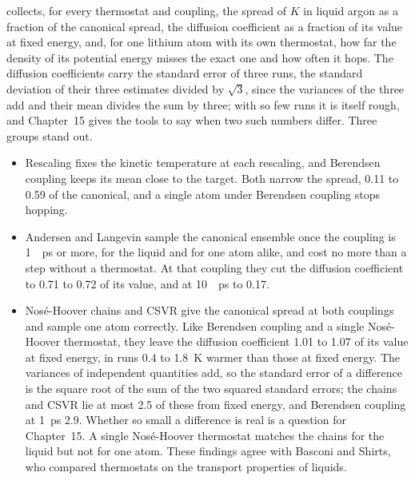  collects, for every thermostat and coupling, the
spread of $K$ in liquid argon as a fraction of the canonical spread, the
diffusion coefficient as a fraction of its value at fixed energy, and,
for one lithium atom with its own thermostat, how far the density of its
potential energy misses the exact one and how often it hops. The
diffusion coefficients carry the standard error of three runs, the
standard deviation of their three estimates divided by $\sqrt3$, since the variances of
the three add and their mean divides the sum by three; with so few runs it
is itself rough, and Chapter~15 gives the tools to say when two such
numbers differ. Three groups stand out.
\begin{itemize}
\item Rescaling fixes the kinetic temperature at each rescaling, and Berendsen
   coupling keeps its mean close to the target. Both narrow the spread, 0.11 to 0.59 of the canonical, and a single atom
   under Berendsen coupling stops hopping.
\item Andersen and Langevin sample the canonical ensemble once the
   coupling is \SI{1}{\per\pico\second} or more, for the liquid and for
   one atom alike, and cost no more than a step without a thermostat. At
   that coupling they cut the diffusion coefficient to 0.71 to 0.72 of its
   value, and at \SI{10}{\per\pico\second} to 0.17.
\item Nosé-Hoover chains and CSVR give the canonical spread at both
   couplings and sample one atom correctly. Like Berendsen coupling and a
   single Nosé-Hoover thermostat, they leave the diffusion coefficient
   1.01 to 1.07 of its value at fixed energy, in runs 0.4 to
   \SI{1.8}{\kelvin} warmer than those at fixed energy. The variances of
   independent quantities add, so the standard error of a difference is
   the square root of the sum of the two squared standard errors; the
   chains and CSVR lie at most 2.5 of these from fixed energy, and
   Berendsen coupling at \SI{1}{\pico\second} 2.9. Whether so small a
   difference is real is a question for Chapter~15. A single Nosé-Hoover thermostat matches the chains for
   the liquid but not for one atom. These findings agree with Basconi and
   Shirts, who compared thermostats on the transport properties of
   liquids\cite{Basconi2013}.
\end{itemize}


